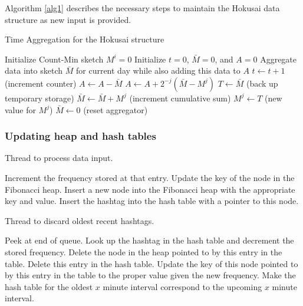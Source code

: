 \documentclass[a4paper,12pt]{article}
\begin{document}
Algorithm \ref{alg1} describes the necessary steps to maintain the Hokusai data structure as new input is provided.

\begin{algorithm}
\caption{Time Aggregation for the Hokusai structure}\label{alg1}
\begin{algorithmic}[1]
	\State Initialize Count-Min sketch $M^i = 0$
\EndFor
\State Initialize $t = 0$, $\bar{M} = 0$, and $A = 0$
	\State Aggregate data into sketch $\bar{M}$ for current day while also adding this data to $A$
	\State $t \leftarrow t + 1$ (increment counter)
	\State $A \leftarrow A - \bar{M}$
		\State $A \leftarrow A + 2^{-j}(\bar{M} - M^j)$
		\State $T \leftarrow \bar{M}$ (back up temporary storage)
		\State $\bar{M} \leftarrow \bar{M} + M^j$ (increment cumulative sum)
		\State $M^j \leftarrow T$ (new value for $M^j$)
	\EndFor
	\State $\bar{M} \leftarrow 0$ (reset aggregator)
\EndWhile
\end{algorithmic}
\end{algorithm}

\subsubsection{Updating heap and hash tables}

\begin{algorithm}
\caption{Thread to process data input.}
\begin{algorithmic}[1]
		\State Increment the frequency stored at that entry.
		\State Update the key of the node in the Fibonacci heap.
	\Else
		\State Insert a new node into the Fibonacci heap with the appropriate key and value. 
		\State Insert the hashtag into the hash table with a pointer to this node.
 	\EndIf
\EndWhile
\end{algorithmic}
\end{algorithm}


\begin{algorithm}
\caption{Thread to discard oldest recent hashtags.}
\begin{algorithmic}[1]
\Loop
		\State Peek at end of queue.
			\State Look up the hashtag in the hash table and decrement the stored frequency.
				\State Delete the node in the heap pointed to by this entry in the table.
				\State Delete this entry in the hash table.
			\Else	
				\State Update the key of this node pointed to by this entry in the table to the proper value given the new frequency.
			\EndIf
		\EndIf
	\EndIf
\EndLoop
\State Make the hash table for the oldest $x$ minute interval correspond to the upcoming $x$ minute interval.

\end{algorithmic}
\end{algorithm}
\end{document}

